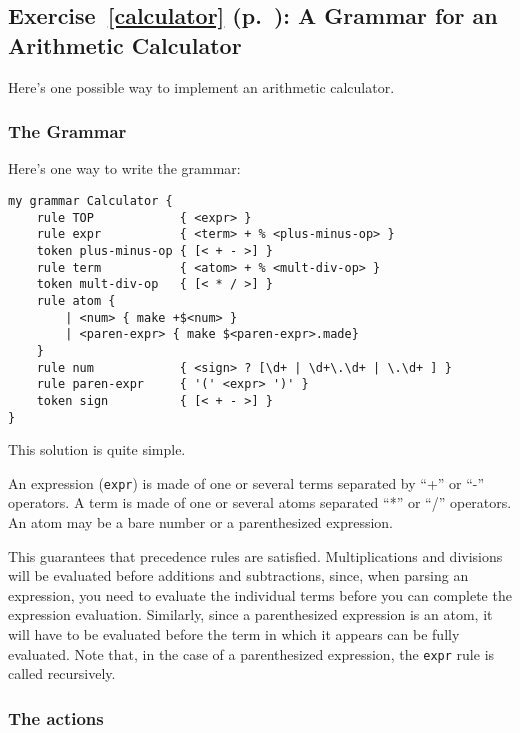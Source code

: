 \subsection{Exercise~\ref{calculator} (p.~\pageref{calculator}): 
A Grammar for an Arithmetic Calculator}
\label{sol_calculator}

Here's one possible way to implement an arithmetic calculator.

\subsubsection{The Grammar}

Here's one way to write the grammar:

\begin{verbatim}
my grammar Calculator {
    rule TOP            { <expr> }
    rule expr           { <term> + % <plus-minus-op> }
    token plus-minus-op { [< + - >] }
    rule term           { <atom> + % <mult-div-op> }
    token mult-div-op   { [< * / >] }
    rule atom {
        | <num> { make +$<num> }
        | <paren-expr> { make $<paren-expr>.made}
    }
    rule num            { <sign> ? [\d+ | \d+\.\d+ | \.\d+ ] }
    rule paren-expr     { '(' <expr> ')' }
    token sign          { [< + - >] }
}
\end{verbatim}

This solution is quite simple.

An expression (\verb'expr') is made of one or several terms 
separated by ``+'' or ``-'' operators. A term is made of one 
or several atoms separated ``*'' or ``/'' operators. An atom 
may be a bare number or a parenthesized expression.

This guarantees that precedence rules are satisfied. 
Multiplications and divisions will be 
evaluated before additions and subtractions, since, when 
parsing an expression, you need to evaluate the individual 
terms before you can complete the expression evaluation. 
Similarly, since a parenthesized expression is an atom, it 
will have to be evaluated before the term in which it 
appears can be fully evaluated. Note that, in the case 
of a parenthesized expression, the \verb'expr' rule 
is called recursively.

\subsubsection{The actions}


